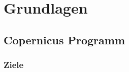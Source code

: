 \newpage
\restoregeometry
\section{Grundlagen}
\subsection{Copernicus Programm}
\subsubsection{Ziele}
